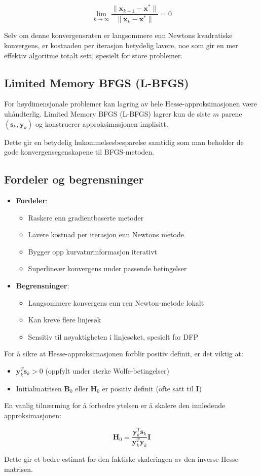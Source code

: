 \[
  \lim_{k \to \infty} \frac{\|\symbf{x}_{k+1} - \symbf{x}^*\|}{\|\symbf{x}_k - \symbf{x}^*\|} = 0
\]

Selv om denne konvergensraten er langsommere enn Newtons kvadratiske konvergens, er kostnaden per iterasjon betydelig lavere, noe som gir en mer effektiv algoritme totalt sett, spesielt for store problemer.

\subsection{Limited Memory BFGS (L-BFGS)}
For høydimensjonale problemer kan lagring av hele Hesse-approksimasjonen være uhåndterlig. Limited Memory BFGS (L-BFGS) lagrer kun de siste \(m\) parene \((\symbf{s}_k, \symbf{y}_k)\) og konstruerer approksimasjonen implisitt.

Dette gir en betydelig hukommelsesbesparelse samtidig som man beholder de gode konvergensegenskapene til BFGS-metoden.

\subsection{Fordeler og begrensninger}
\begin{itemize}
  \item \textbf{Fordeler}:
        \begin{itemize}
          \item Raskere enn gradientbaserte metoder
          \item Lavere kostnad per iterasjon enn Newtons metode
          \item Bygger opp kurvaturinformasjon iterativt
          \item Superlineær konvergens under passende betingelser
        \end{itemize}
  \item \textbf{Begrensninger}:
        \begin{itemize}
          \item Langsommere konvergens enn ren Newton-metode lokalt
          \item Kan kreve flere linjesøk
          \item Sensitiv til nøyaktigheten i linjesøket, spesielt for DFP
        \end{itemize}
\end{itemize}

For å sikre at Hesse-approksimasjonen forblir positiv definit, er det viktig at:

\begin{itemize}
  \item \(\symbf{y}_k^T\symbf{s}_k > 0\) (oppfylt under sterke Wolfe-betingelser)
  \item Initialmatrisen \(\symbf{B}_0\) eller \(\symbf{H}_0\) er positiv definit (ofte satt til \(\symbf{I}\))
\end{itemize}

En vanlig tilnærming for å forbedre ytelsen er å skalere den innledende approksimasjonen:

\[
  \symbf{H}_0 = \frac{\symbf{y}_k^T\symbf{s}_k}{\symbf{y}_k^T\symbf{y}_k}\symbf{I}
\]

Dette gir et bedre estimat for den faktiske skaleringen av den inverse Hesse-matrisen.
